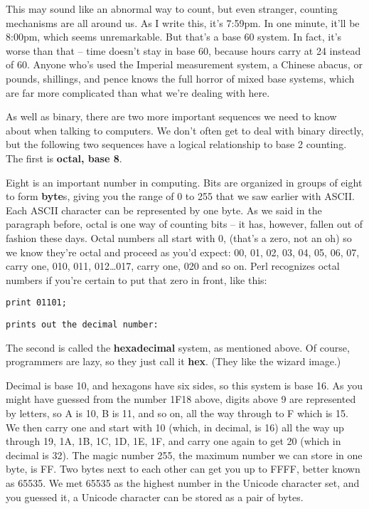 \documentclass[a4paper,12pt,twoside]{book}
\begin{document}
\noindent 

\noindent This may sound like an abnormal way to count, but even stranger, counting mechanisms are all around us. As I write this, it's 7:59pm. In one minute, it'll be 8:00pm, which seems unremarkable. But that's a base 60 system. In fact, it's worse than that -- time doesn't stay in base 60, because hours carry at 24 instead of 60. Anyone who's used the Imperial measurement system, a Chinese abacus, or pounds, shillings, and pence knows the full horror of mixed base systems, which are far more complicated than what we're dealing with here.

\noindent 

\noindent As well as binary, there are two more important sequences we need to know about when talking to computers. We don't often get to deal with binary directly, but the following two sequences have a logical relationship to base 2 counting. The first is \textbf{octal, base 8}.

\noindent 

\noindent Eight is an important number in computing. Bits are organized in groups of eight to form \textbf{byte}s, giving you the range of 0 to 255 that we saw earlier with ASCII. Each ASCII character can be represented by one byte. As we said in the paragraph before, octal is one way of counting bits -- it has, however, fallen out of fashion these days. Octal numbers all start with 0, (that's a zero, not an oh) so we know they're octal and proceed as you'd expect: 00, 01, 02, 03, 04, 05, 06, 07, carry one, 010, 011, 012\dots 017, carry one, 020 and so on. Perl recognizes octal numbers if you're certain to put that zero in front, like this:

\noindent 

\noindent \texttt{print 01101;}

\noindent 

\noindent \texttt{prints out the decimal number:}

\noindent 


\noindent The second is called the \textbf{hexadecimal }system, as mentioned above. Of course, programmers are lazy, so they just call it \textbf{hex}. (They like the wizard image.)

\noindent 

\noindent 

\noindent Decimal is base 10, and hexagons have six sides, so this system is base 16. As you might have guessed from the number 1F18 above, digits above 9 are represented by letters, so A is 10, B is 11, and so on, all the way through to F which is 15. We then carry one and start with 10 (which, in decimal, is 16) all the way up through 19, 1A, 1B, 1C, 1D, 1E, 1F, and carry one again to get 20 (which in decimal is 32). The magic number 255, the maximum number we can store in one byte, is FF. Two bytes next to each other can get you up to FFFF, better known as 65535. We met 65535 as the highest number in the Unicode character set, and you guessed it, a Unicode character can be stored as a pair of bytes.
\end{document}
